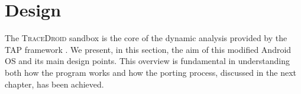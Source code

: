 \chapter{Design}
\label{chap:scope}
The \textsc{TraceDroid} sandbox is the core of the dynamic analysis provided by
the \textsc{TAP} framework \cite{ref1}. We present, in this section, the aim of this
modified Android OS and its main design points. This overview is
fundamental in understanding both how the program works and how the
porting process, discussed in the next chapter, has been achieved.
